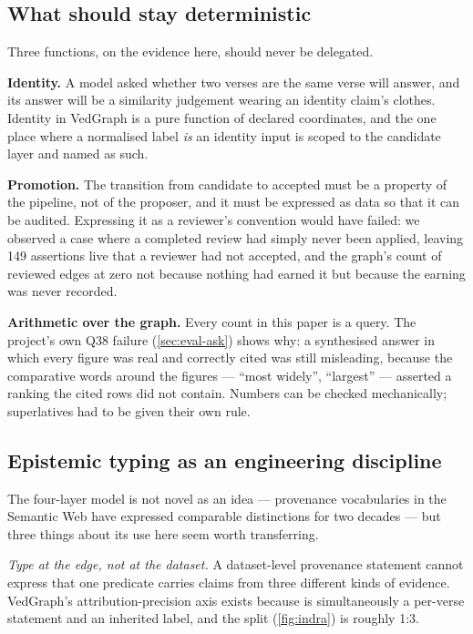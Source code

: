 \subsection{What should stay deterministic}

Three functions, on the evidence here, should never be delegated.

\textbf{Identity.} A model asked whether two verses are the same verse will answer,
and its answer will be a similarity judgement wearing an identity claim's clothes.
Identity in VedGraph is a pure function of declared coordinates, and the one place
where a normalised label \emph{is} an identity input is scoped to the candidate layer
and named as such.

\textbf{Promotion.} The transition from candidate to accepted must be a property of
the pipeline, not of the proposer, and it must be expressed as data so that it can be
audited. Expressing it as a reviewer's convention would have failed: we observed a
case where a completed review had simply never been applied, leaving 149 assertions
live that a reviewer had not accepted, and the graph's count of reviewed edges at
zero not because nothing had earned it but because the earning was never recorded.

\textbf{Arithmetic over the graph.} Every count in this paper is a query. The
project's own Q38 failure (\cref{sec:eval-ask}) shows why: a synthesised answer in
which every figure was real and correctly cited was still misleading, because the
comparative words around the figures --- ``most widely'', ``largest'' --- asserted a
ranking the cited rows did not contain. Numbers can be checked mechanically;
superlatives had to be given their own rule.

\subsection{Epistemic typing as an engineering discipline}

The four-layer model is not novel as an idea --- provenance vocabularies in the
Semantic Web have expressed comparable distinctions for two decades --- but three
things about its use here seem worth transferring.

\emph{Type at the edge, not at the dataset.} A dataset-level provenance statement
cannot express that one predicate carries claims from three different kinds of
evidence. VedGraph's attribution-precision axis exists because  is
simultaneously a per-verse statement and an inherited label, and the split
(\cref{fig:indra}) is roughly 1:3.

